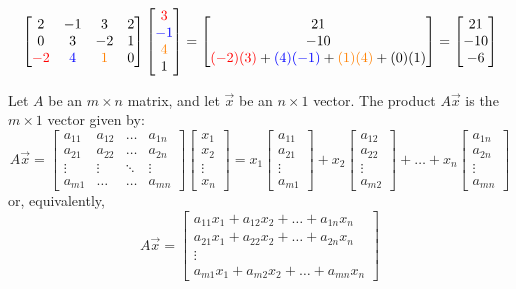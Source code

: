 \documentclass{ximera}
\begin{document}
\begin{exploration}
$$\begin{bmatrix}2&-1&3&2\\0&3&-2&1\\{\color{red}-2}&{\color{blue}4}&{\color{orange}1}&0\end{bmatrix}\begin{bmatrix}{\color{red}3}\\{\color{blue}-1}\\{\color{orange}4}\\1\end{bmatrix}=\begin{bmatrix}21\\-10\\{\color{red}(-2)( 3)}+{\color{blue}(4)(-1)}+{\color{orange}(1)(4)}+(0)(1) \end{bmatrix}=\begin{bmatrix}21\\-10 \\ -6\end{bmatrix}
$$



\end{exploration}
\begin{definition}\label{def:matrixvectormult}
Let $A$ be an $m\times n$ matrix, and let $\vec{x}$ be an $n\times 1$ vector.  The product $A\vec{x}$ is the $m\times 1$ vector given by:
$$A\vec{x}=\begin{bmatrix}
           a_{11} & a_{12}&\dots&a_{1n}\\
           a_{21}&a_{22} &\dots &a_{2n}\\
		\vdots & \vdots&\ddots &\vdots\\
		a_{m1}&\dots &\dots &a_{mn}
         \end{bmatrix}\begin{bmatrix}x_1\\x_2\\\vdots\\x_n\end{bmatrix}=
         x_1\begin{bmatrix}a_{11}\\a_{21}\\ \vdots \\a_{m1}\end{bmatrix}+
         x_2\begin{bmatrix}a_{12}\\a_{22}\\ \vdots \\a_{m2}\end{bmatrix}+\dots+
         x_n\begin{bmatrix}a_{1n}\\a_{2n}\\ \vdots \\a_{mn}\end{bmatrix}$$
or, equivalently,
$$A\vec{x}=\begin{bmatrix}a_{11}x_1+a_{12}x_2+\ldots +a_{1n}x_n\\a_{21}x_1+a_{22}x_2+\ldots +a_{2n}x_n\\\vdots\\a_{m1}x_1+a_{m2}x_2+\ldots +a_{mn}x_n\end{bmatrix}$$
\end{definition}
\end{document}
